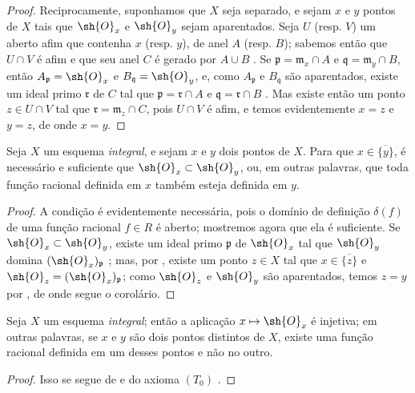 \documentclass[oneside]{amsart}
\makeatletter
\newcommand{\ega@arrow}[2]{\mathchoice{#1}{#2}{#2}{#2}}
\let\ega@shortmapsto\mapsto
\renewcommand{\mapsto}{\ega@arrow{\longmapsto}{\ega@shortmapsto}}
\let\EGAOriginalLabel\label
\renewcommand{\label}[1]{\phantomsection\EGAOriginalLabel{#1}}
\makeatother
\begin{document}
\begin{proof}
Reciprocamente, suponhamos que $X$ seja separado, e sejam $x$ e $y$ pontos de $X$ tais que $\sh{O}_x$ e $\sh{O}_y$ sejam aparentados.
Seja $U$ (resp. $V$) um aberto afim que contenha $x$ (resp. $y$), de anel $A$ (resp. $B$);
sabemos então que $U\cap V$ é afim e que seu anel $C$ é gerado por $A\cup B$ .
Se $\mathfrak{p}=\mathfrak{m}_x\cap A$ e $\mathfrak{q}=\mathfrak{m}_y\cap B$, então $A_\mathfrak{p}=\sh{O}_x$ e $B_\mathfrak{q}=\sh{O}_y$, e, como $A_\mathfrak{p}$ e $B_\mathfrak{q}$ são aparentados, existe um ideal primo $\mathfrak{r}$ de $C$ tal que $\mathfrak{p}=\mathfrak{r}\cap A$ e $\mathfrak{q}=\mathfrak{r}\cap B$ .
Mas existe então um ponto $z\in U\cap V$ tal que $\mathfrak{r}=\mathfrak{m}_z\cap C$, pois $U\cap V$ é afim, e temos evidentemente $x=z$ e $y=z$, de onde $x=y$.
\end{proof}

\begin{corollary}[8.2.3]
\label{I.8.2.3}
Seja $X$ um esquema \emph{integral}, e sejam $x$ e $y$ dois pontos de $X$.
Para que $x\in\overline{\{y\}}$, é necessário e suficiente que
$\sh{O}_x\subset\sh{O}_y$, ou, em outras palavras, que toda função racional
definida em $x$ também esteja definida em $y$.
\end{corollary}

\begin{proof}
A condição é evidentemente necessária, pois o domínio de definição
$\delta(f)$ de uma função racional $f\in R$ é aberto; mostremos agora
que ela é suficiente.
Se $\sh{O}_x\subset\sh{O}_y$, existe um ideal primo $\mathfrak{p}$
de $\sh{O}_x$ tal que $\sh{O}_y$ domina
$(\sh{O}_x)_\mathfrak{p}$ ; mas, por , existe
um ponto $z\in X$ tal que $x\in\overline{\{z\}}$ e
$\sh{O}_z=(\sh{O}_x)_\mathfrak{p}$; como $\sh{O}_z$ e $\sh{O}_y$ são
aparentados, temos $z=y$ por , de onde segue o corolário.
\end{proof}

\begin{corollary}[8.2.4]
\label{I.8.2.4}
Seja $X$ um esquema \emph{integral}; então a aplicação $x\mapsto\sh{O}_x$ é injetiva; em outras palavras, se $x$ e $y$ são dois pontos distintos de $X$, existe uma função racional definida em um desses pontos e não no outro.
\end{corollary}

\begin{proof}
Isso se segue de  e do axioma $(T_0)$ .
\end{proof}
\end{document}

